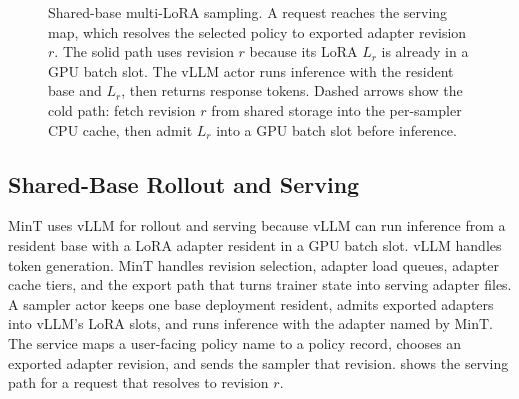 \documentclass{llmxive}
\begin{document}
\begin{figure}[!htbp]
{
}
\caption{Shared-base multi-LoRA sampling. A request reaches the serving map, which resolves the selected policy to exported adapter revision $r$. The solid path uses revision $r$ because its LoRA $L_r$ is already in a GPU batch slot. The vLLM actor runs inference with the resident base and $L_r$, then returns response tokens. Dashed arrows show the cold path: fetch revision $r$ from shared storage into the per-sampler CPU cache, then admit $L_r$ into a GPU batch slot before inference.}
    \label{fig:mint_system_blocks}
\end{figure}

\subsection{Shared-Base Rollout and Serving}

MinT uses vLLM for rollout and serving because vLLM can run inference from a resident base with a LoRA adapter resident in a GPU batch slot. vLLM handles token generation. MinT handles revision selection, adapter load queues, adapter cache tiers, and the export path that turns trainer state into serving adapter files. A sampler actor keeps one base deployment resident, admits exported adapters into vLLM's LoRA slots, and runs inference with the adapter named by MinT. The service maps a user-facing policy name to a policy record, chooses an exported adapter revision, and sends the sampler that revision.  shows the serving path for a request that resolves to revision $r$.
\end{document}
